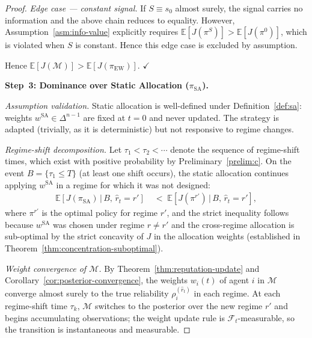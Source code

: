 \documentclass[12pt,openany]{book}
\newcommand{\E}{\mathbb{E}}
\numberwithin{equation}{chapter}
\theoremstyle{plain}
\theoremstyle{definition}
\theoremstyle{remark}
\numberwithin{equation}{chapter}
\theoremstyle{plain}
\begin{document}
\begin{proof}
\medskip
\noindent\textit{Edge case — constant signal.}
If $S \equiv s_0$ almost surely, the signal carries no information
and the above chain reduces to equality.  However,
Assumption~\ref{asm:info-value} explicitly requires $\E[J(\pi^S)] >
\E[J(\pi^0)]$, which is violated when $S$ is constant.  Hence this
edge case is excluded by assumption.

\medskip
Hence $\E[J(\mathcal{M})] > \E[J(\pi_{\mathrm{EW}})]$. \hfill$\checkmark$

\bigskip
\noindent\textbf{Step~3: Dominance over Static Allocation
($\pi_{\mathrm{SA}}$).}

\medskip
\noindent\textit{Assumption validation.}
Static allocation is well-defined under Definition~\ref{def:sa}:
weights $w^{\mathrm{SA}} \in \Delta^{n-1}$ are fixed at $t=0$ and
never updated.  The strategy is adapted (trivially, as it is
deterministic) but not responsive to regime changes.

\medskip
\noindent\textit{Regime-shift decomposition.}
Let $\tau_1 < \tau_2 < \cdots$ denote the sequence of regime-shift
times, which exist with positive probability by
Preliminary~\ref{prelim:c}.  On the event
$B = \{\tau_1 \le T\}$ (at least one shift occurs), the
static allocation continues applying $w^{\mathrm{SA}}$ in a regime
for which it was not designed:
\begin{align}
  \E\!\left[J(\pi_{\mathrm{SA}})\,\big|\,B,\,\hat{r}_t = r'\right]
  &\;<\;
  \E\!\left[J(\pi^{r'})\,\big|\,B,\,\hat{r}_t = r'\right],
  \label{eq:step3-regime}
\end{align}
where $\pi^{r'}$ is the optimal policy for regime $r'$, and the
strict inequality follows because $w^{\mathrm{SA}}$ was chosen
under regime $r \ne r'$ and the cross-regime allocation is
sub-optimal by the strict concavity of $J$ in the allocation
weights (established in Theorem~\ref{thm:concentration-suboptimal}).

\medskip
\noindent\textit{Weight convergence of $\mathcal{M}$.}
By Theorem~\ref{thm:reputation-update} and
Corollary~\ref{cor:posterior-convergence}, the weights $w_i(t)$
of agent $i$ in $\mathcal{M}$ converge almost surely to the
true reliability $\rho_i^{(\hat{r}_t)}$ in each regime.
At each regime-shift time $\tau_k$, $\mathcal{M}$ switches to
the posterior over the new regime $r'$ and begins accumulating
observations; the weight update rule is $\mathcal{F}_t$-measurable,
so the transition is instantaneous and measurable.


\end{proof}
\end{document}
